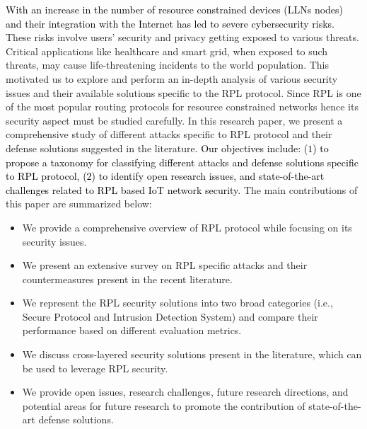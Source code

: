 \documentclass[10pt,journal,sort & compress]{IEEEtran}
\begin{document}
\textcolor{black}{With an increase in the number of resource constrained devices (LLNs nodes) and their integration with the Internet has led to severe cybersecurity risks.} These risks involve users' security and privacy getting exposed to various threats. Critical applications like healthcare and smart grid, when exposed to such threats, may cause life-threatening incidents to the world population. This motivated us to explore and perform an in-depth analysis of various security issues and their available solutions specific to the RPL protocol.  Since RPL is one of the most popular routing protocols for resource constrained networks hence its security aspect must be studied carefully. In this research paper, we present a comprehensive study of different attacks specific to RPL protocol and their defense solutions suggested in the literature. \textcolor{black}{Our objectives include: ($ 1 $) to propose a taxonomy for classifying different attacks and defense solutions specific to RPL protocol, ($ 2 $) to identify open research issues, and state-of-the-art challenges related to RPL based IoT network security.} The main contributions of this paper are summarized below:
\begin{itemize}
	\item We provide a comprehensive overview of RPL protocol while focusing on its security issues.
	\item We present an extensive survey on RPL specific attacks and their countermeasures present in the recent literature.
	\item We represent the RPL security solutions into two broad categories (i.e., Secure Protocol and Intrusion Detection System) and compare their performance based on different evaluation metrics.
	\item We discuss cross-layered security solutions present in the literature, which can be used to leverage RPL security.
	\item We provide open issues, research challenges, future research directions, and potential areas for future research to promote the contribution of state-of-the-art defense solutions.
	
\end{itemize}
\end{document}
